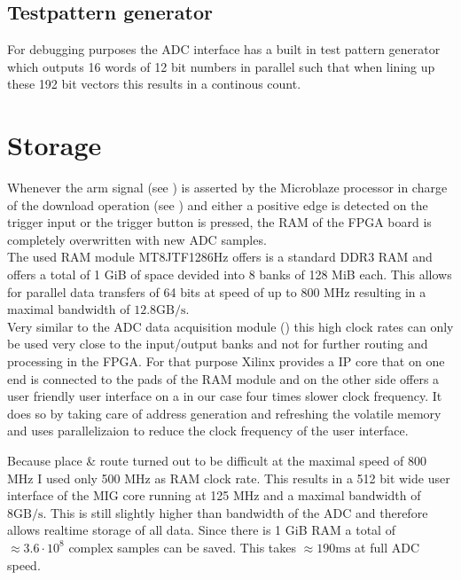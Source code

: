 \subsection{Testpattern generator}
For debugging purposes the \gls{ADC} interface has a built in test pattern
generator which outputs 16 words of 12 bit numbers in parallel such that
when lining up these 192 bit vectors this results in a continous count.

\section{Storage}
\label{sec:fpga_storage}
Whenever the arm signal (see ) is asserted
by the Microblaze processor in charge of the download operation
(see ) and either a positive edge is detected
on the trigger input or the trigger button is pressed,
the \gls{RAM} of the \gls{FPGA} board is completely overwritten with new
\gls{ADC} samples. \\

The used \gls{RAM} module MT8JTF1286Hz offers is a standard DDR3 \gls{RAM}
and offers a total of 1 GiB of space devided into 8 banks of 128 MiB each.
This allows for parallel data transfers of 64 bits at speed of up to 800 MHz
resulting in a maximal bandwidth of $12.8 \text{GB}/\text{s}$. \\

Very similar to the \gls{ADC} data acquisition module ()
this high clock rates can only be used very close to the input/output banks
and not for further routing and processing in the \gls{FPGA}.
For that purpose Xilinx provides a \gls{IP} core that on one end is connected
to the pads of the \gls{RAM} module and on the other side offers a user
friendly user interface on a in our case four times slower clock frequency.
It does so by taking care of address generation and refreshing the volatile
memory and uses parallelizaion to reduce the clock frequency of the user
interface. \\

Because place \& route turned out to be difficult at the maximal speed
of 800 MHz I used only 500 MHz as \gls{RAM} clock rate. This results
in a 512 bit wide user interface of the \gls{MIG} core running at 125 MHz
and a maximal bandwidth of $8 \text{GB}/\text{s}$. This is still slightly
higher than bandwidth of the \gls{ADC} and therefore allows realtime
storage of all data. Since there is 1 GiB \gls{RAM}
a total of $\approx 3.6 \cdot 10^8$ complex samples can be saved. This
takes $\approx 190 \text{ms}$ at full \gls{ADC} speed. \\

